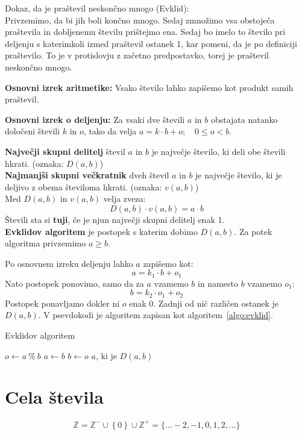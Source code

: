 \documentclass[a4paper,oneside,12pt,fleqn]{article}
\def\Z{\ensuremath{\mathbb Z}}
\newcommand\krat\cdot
\numberwithin{equation}{section}
\begin{document}
Dokaz, da je praštevil neskončno mnogo (Evklid): \\
Privzemimo, da bi jih boli končno mnogo. Sedaj zmnožimo vsa obstoječa praštevila in dobljenemu
številu prištejmo ena. Sedaj bo imelo to število pri deljenju s katerimkoli izmed praštevil ostanek
1, kar pomeni, da je po definiciji praštevilo. To je v protislovju z začetno predpostavko, torej je
praštevil neskončno mnogo.

\textbf{Osnovni izrek aritmetike:} Vsako število lahko zapišemo kot produkt
samih praštevil.

\textbf{Osnovni izrek o deljenju:} Za vsaki dve števili $a$ in $b$ obstajata
natanko določeni števili $k$ in $o$, tako da velja $a = k \krat b+ o; \quad 0 \leq o < b$.

\textbf{Največji skupni delitelj} števil $a$ in $b$ je največje število, ki deli obe števili
hkrati. (oznaka: $D(a,b)$) \\
\textbf{Najmanjši skupni večkratnik} dveh števil $a$ in $b$ je največje število, ki je deljivo z obema
številoma hkrati. (oznaka: $v(a,b)$) \\
Med $D(a,b)$ in $v(a,b)$ velja zveza:
\[ D(a,b) \krat v(a,b) = a \krat b \]
Števili sta si \textbf{tuji}, če je njun največji skupni delitelj enak 1. \\
\textbf{Evklidov algoritem} je postopek s katerim dobimo $D(a,b)$. Za potek algoritma privzemimo $a
\ge b$.

Po osnovnem izreku  deljenju lahko $a$ zapišemo kot:
\[ a = k_1\krat b + o_1 \]
Nato postopek ponovimo, samo da za $a$ vzamemo $b$ in namesto $b$ vzamemo $o_1$:
\[ b = k_2\krat o_1 + o_2 \]
Postopek ponavljamo dokler ni $o$ enak 0. Zadnji od nič različen
ostanek je $D(a,b)$. V psevdokodi je algoritem zapisan kot algoritem~\ref{algo:evklid}.

\begin{algorithm}[h]
  \caption{Evklidov algoritem}\label{algo:evklid}
  \begin{algorithmic}[1]
        \State $o \gets a\ \%\ b$
        \State $a \gets b$
        \State $b \gets o$
    \EndWhile
    \State \Return $a$, ki je $D(a, b)$
  \end{algorithmic}
\end{algorithm}

\section{Cela števila}
\label{sec:cela}
\[ \Z = \Z^- \cup \left\{ 0 \right\} \cup \Z^+ = \{ \ldots -2, -1, 0, 1, 2, \ldots \} \]
\end{document}
